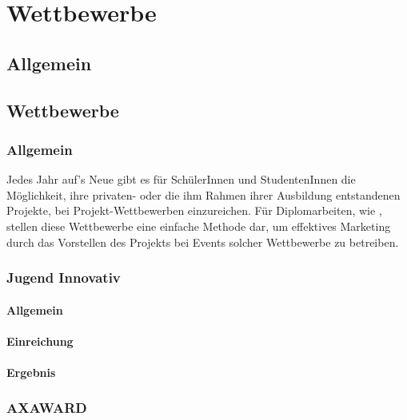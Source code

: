 \chapter{Wettbewerbe}
\renewcommand{\kapitelautor}{Autor: Andreas Novak}

\section{Allgemein}

\section{Wettbewerbe}
\subsection{Allgemein}
Jedes Jahr auf's Neue gibt es für SchülerInnen und StudentenInnen die Möglichkeit, ihre privaten-
oder die ihm Rahmen ihrer Ausbildung entstandenen Projekte, bei Projekt-Wettbewerben
einzureichen. Für Diplomarbeiten, wie \sblit, stellen diese Wettbewerbe eine einfache
Methode dar, um effektives Marketing durch das Vorstellen des Projekts bei Events solcher
Wettbewerbe zu betreiben.

\subsection{Jugend Innovativ}
\subsubsection{Allgemein}

\subsubsection{Einreichung}

\subsubsection{Ergebnis}


\subsection{AXAWARD}
